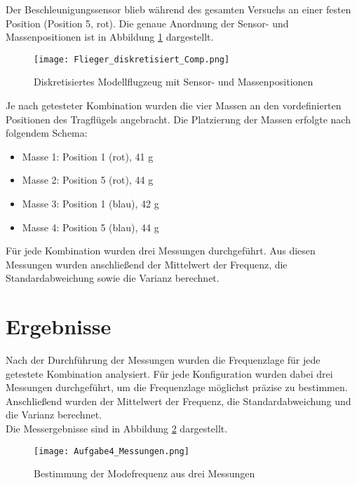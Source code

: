     \noindent
    Der Beschleunigungssensor blieb während des gesamten Versuchs an einer festen Position 
    (Position 5, rot). Die genaue Anordnung der Sensor- und Massenpositionen ist in 
    Abbildung \ref{fig: Flieger_diskretisiert} dargestellt.

    \begin{figure}[H]
        \centering
        \texttt{[image: Flieger\_diskretisiert\_Comp.png]}
        \caption{Diskretisiertes Modellflugzeug mit Sensor- und Massenpositionen}
        \label{fig: Flieger_diskretisiert}
    \end{figure}

    \noindent
    Je nach getesteter Kombination wurden die vier Massen an den vordefinierten Positionen 
    des Tragflügels angebracht. Die Platzierung der Massen erfolgte nach folgendem Schema:

    \begin{itemize}
        \item Masse 1: Position 1 (rot), 41 g  
        \item Masse 2: Position 5 (rot), 44 g  
        \item Masse 3: Position 1 (blau), 42 g  
        \item Masse 4: Position 5 (blau), 44 g  
    \end{itemize}

    \noindent
    Für jede Kombination wurden drei Messungen durchgeführt. Aus diesen Messungen wurden 
    anschließend der Mittelwert der Frequenz, die Standardabweichung sowie die Varianz berechnet.
\section{Ergebnisse}
    Nach der Durchführung der Messungen wurden die Frequenzlage für jede getestete 
    Kombination analysiert. Für jede Konfiguration wurden dabei drei Messungen durchgeführt, 
    um die Frequenzlage möglichst präzise zu bestimmen. Anschließend wurden der Mittelwert der 
    Frequenz, die Standardabweichung und die Varianz berechnet.  
    \\

    \noindent
    Die Messergebnisse sind in Abbildung \ref{fig: Aufgabe4_Messungen} dargestellt.
    
    \begin{figure}[H]
        \centering
        \texttt{[image: Aufgabe4\_Messungen.png]}
        \caption{Bestimmung der Modefrequenz aus drei Messungen}
        \label{fig: Aufgabe4_Messungen}
    \end{figure}
    
